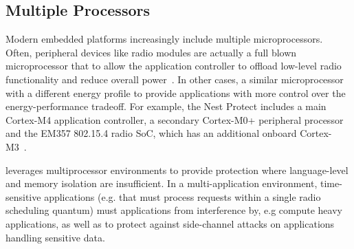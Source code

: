 \subsection{Multiple Processors}

Modern embedded platforms increasingly include multiple microprocessors. Often,
peripheral devices like radio modules are actually a full blown microprocessor
that to allow the application controller to offload low-level radio
functionality and reduce overall power~\cite{nrf51822,cc2540}. In other cases, a
similar microprocessor with a different energy profile to provide applications
with more control over the energy-performance tradeoff.  For example, the Nest
Protect includes a main Cortex-M4 application controller, a secondary Cortex-M0+
peripheral processor and the EM357 802.15.4 radio SoC, which has an additional
onboard Cortex-M3~\cite{nestprotect-teardown}.

\name leverages multiprocessor environments to provide protection where
language-level and memory isolation are insufficient. In a multi-application
environment, time-sensitive applications (e.g. that must process requests within
a single radio scheduling quantum) must 
applications from interference by, e.g compute heavy applications, as well as to
protect against side-channel attacks on applications handling sensitive data.

